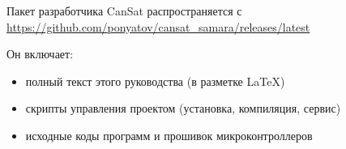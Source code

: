 
Пакет разработчика CanSat распространяется с\\\url{https://github.com/ponyatov/cansat_samara/releases/latest}

Он включает:
\begin{itemize}[nosep]
    \item полный текст этого руководства (в разметке \LaTeX)
    \item скрипты управления проектом (установка, компиляция, сервис)
    \item исходные коды программ и прошивок микроконтроллеров
\end{itemize}







